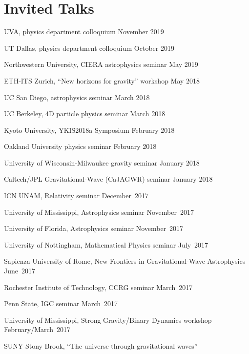 \newcommand{\playsymbol}{$\blacktriangleright$}
\section{\sc Invited Talks}
\begin{etaremune}
\item
  UVA, physics department colloquium
  \hfill{}
  November 2019
\item
  UT Dallas, physics department colloquium
  \hfill{}
  October 2019
\item
  Northwestern University, CIERA astrophysics seminar
  \hfill{}
  May 2019
\item
  ETH-ITS Zurich, ``New horizons for gravity'' workshop
  \hfill{}
  May 2018
\item
  UC San Diego, astrophysics seminar
  \hfill{}
  March 2018
\item
  UC Berkeley, 4D particle physics seminar
  \hfill{}
  March 2018
\item
  Kyoto University, YKIS2018a Symposium
  \hfill{}
  February 2018
\item
  Oakland University physics seminar
  \hfill{}
  February 2018
\item
  University of Wisconsin-Milwaukee gravity seminar
  \hfill{}
  January 2018
\item
  Caltech/JPL Gravitational-Wave (CaJAGWR) seminar
  \hfill{}
  January 2018
\item
  ICN UNAM,
  Relativity seminar
  \hfill{}
  December~2017
\item
  University of Mississippi,
  Astrophysics seminar
  \hfill{}
  November~2017
\item
  University of Florida,
  Astrophysics seminar
  \hfill{}
  November~2017
\item
  University of Nottingham,
  Mathematical Physics seminar
  \hfill{}
  July~2017
\item
  Sapienza University of Rome,
  New Frontiers in Gravitational-Wave Astrophysics
  \hfill{}
  June~2017
\item
  Rochester Institute of Technology,
  CCRG seminar
  \hfill{}
  March~2017
\item
  Penn State,
  IGC seminar
  \hfill{}
  March~2017
\item
  University of Mississippi,
  Strong Gravity/Binary Dynamics workshop
  \hfill{}
  February/March~2017
\item
  SUNY Stony Brook,
  ``The universe through gravitational waves''

\end{etaremune}

